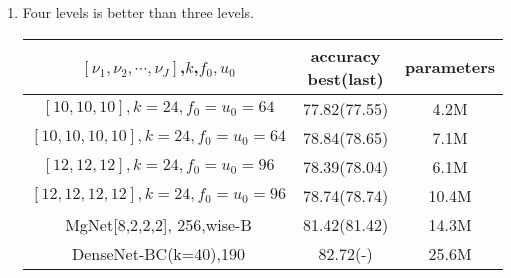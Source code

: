 \begin{enumerate}
\item Four levels is better than three levels.

\begin{table}[!htbp]
	\begin{center}
			\begin{tabular}{|c|c|c|}
                \hline
				$[\nu_1,\nu_2,\cdots,\nu_J]$,$k$,$f_0,u_0$              &  accuracy best(last)  &   parameters \tabularnewline
				\hline		
				$[10,10,10],k=24,f_0=u_0=64$                            &  77.82(77.55)         &     4.2M        \tabularnewline
				\hline		
				$[10,10,10,10],k=24,f_0=u_0=64$                         &  78.84(78.65)         &     7.1M        \tabularnewline
                \hline
                \hline		
				$[12,12,12],k=24,f_0=u_0=96 $                        &  78.39(78.04)         &     6.1M        \tabularnewline
                \hline		
				$[12,12,12,12],k=24,f_0=u_0=96$                      &  78.74(78.74)         &     10.4M        \tabularnewline
                \hline
                \hline
                MgNet[8,2,2,2], 256,wise-B                    &  81.42(81.42)         &     14.3M        \tabularnewline
                \hline
                DenseNet-BC(k=40),190                         &  82.72(-)             &     25.6M        \tabularnewline
                \hline
			\end{tabular}
	\end{center}
\end{table}




\end{enumerate}
